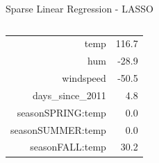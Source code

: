 \documentclass[11pt,compress,t,notes=noshow, aspectratio=169, xcolor=table]{beamer}
\begin{document}
\begin{frame}{Sparse Linear Regression - LASSO }
\begin{columns}[T, totalwidth=\linewidth]
\begin{column}{0.35\textwidth}
\begin{table}[ht]
\begin{tabular}{rr}
  temp & 116.7 \\ 
  hum & -28.9 \\ 
  windspeed & -50.5 \\ 
  days\_since\_2011 & 4.8 \\ 
  seasonSPRING:temp & 0.0 \\ 
  seasonSUMMER:temp & 0.0 \\ 
  seasonFALL:temp & 30.2 \\ 
   \hline
\end{tabular}
\end{table}
\end{column}
\end{columns}

\end{frame}
\end{document}
